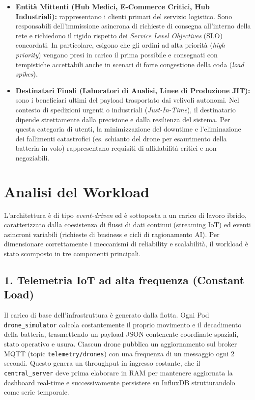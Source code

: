 \begin{itemize}
    \item \textbf{Entità Mittenti (Hub Medici, E-Commerce Critici, Hub Industriali):}
    rappresentano i clienti primari del servizio logistico. Sono responsabili dell'immissione asincrona di richieste di consegna all'interno della rete e richiedono il rigido rispetto dei \textit{Service Level Objectives} (SLO) concordati. In particolare, esigono che gli ordini ad alta priorità (\textit{high priority}) vengano presi in carico il prima possibile e consegnati con tempistiche accettabili anche in scenari di forte congestione della coda (\textit{load spikes}).

    \item \textbf{Destinatari Finali (Laboratori di Analisi, Linee di Produzione JIT):}
    sono i beneficiari ultimi del payload trasportato dai velivoli autonomi. Nel contesto di spedizioni urgenti o industriali (\textit{Just-In-Time}), il destinatario dipende strettamente dalla precisione e dalla resilienza del sistema. Per questa categoria di utenti, la minimizzazione del downtime e l'eliminazione dei fallimenti catastrofici (es. schianto del drone per esaurimento della batteria in volo) rappresentano requisiti di affidabilità critici e non negoziabili.
\end{itemize}

\section{Analisi del Workload}
\label{sec:analisi_workload}

L'architettura è di tipo \textit{event-driven} ed è sottoposta a un carico di lavoro ibrido, caratterizzato dalla coesistenza di flussi di dati continui (streaming IoT) ed eventi asincroni variabili (richieste di business e cicli di ragionamento AI). Per dimensionare correttamente i meccanismi di reliability e scalabilità, il workload è stato scomposto in tre componenti principali.

\subsection*{1. Telemetria IoT ad alta frequenza (Constant Load)}
Il carico di base dell'infrastruttura è generato dalla flotta. Ogni Pod \texttt{drone\_simulator} calcola costantemente il proprio movimento e il decadimento della batteria, trasmettendo un payload JSON contenente coordinate spaziali, stato operativo e usura. Ciascun drone pubblica un aggiornamento sul broker MQTT (topic \texttt{telemetry/drones}) con una frequenza di un messaggio ogni 2 secondi. Questo genera un throughput in ingresso costante, che il \texttt{central\_server} deve prima elaborare in RAM per mantenere aggiornata la dashboard real-time e successivamente persistere su InfluxDB strutturandolo come serie temporale.

